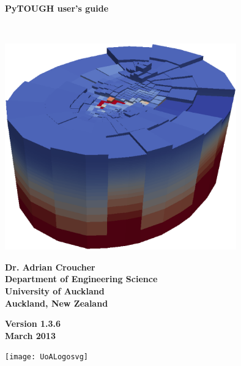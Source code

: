 \begin{titlepage}

\begin{center}

\bigskip\

\textbf{\Huge{PyTOUGH user's guide}}

\bigskip\

\includegraphics[width=0.75\textwidth]{coverpic}

\bigskip

\textbf{\large{Dr. Adrian Croucher\\
Department of Engineering Science\\
University of Auckland\\
Auckland, New Zealand}}

\bigskip

\textbf{\large{Version 1.3.6\\
March 2013}}

\bigskip
\bigskip
\bigskip
\bigskip
\bigskip

\texttt{[image: UoALogosvg]}

\end{center}
\end{titlepage}

